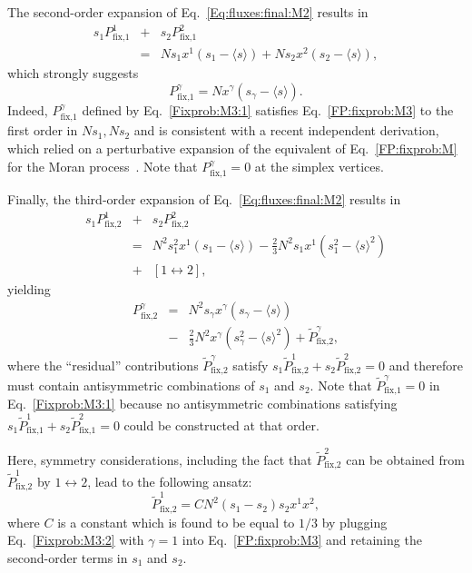 \documentclass[9pt,twocolumn,twoside]{gsajnl}
\begin{document}
The second-order expansion of Eq.~\eqref{Eq:fluxes:final:M2} results in
\begin{eqnarray} \label{Constr:M3:2}
s_1 P_{\text{fix,1}}^{1} &+& s_2 P_{\text{fix,1}}^{2} \\
&=& N s_1 x^1 (s_1 - \langle s \rangle) + N s_2 x^2 (s_2 - \langle s \rangle), \nonumber
\end{eqnarray}
which strongly suggests
\begin{equation} \label{Fixprob:M3:1}
P_{\text{fix,1}}^{\gamma} = N x^\gamma (s_\gamma - \langle s \rangle).
\end{equation}
Indeed, $P_{\text{fix,1}}^{\gamma}$ defined by Eq.~\eqref{Fixprob:M3:1} satisfies Eq.~\eqref{FP:fixprob:M3} to the first order in $Ns_1,Ns_2$ and is consistent with
a recent independent derivation, which relied on a perturbative expansion of the equivalent of Eq.~\eqref{FP:fixprob:M} for the Moran process~\citep{Braga2026}.
Note that $P_{\text{fix,1}}^{\gamma} = 0$ at the simplex vertices. 

Finally, the third-order expansion of Eq.~\eqref{Eq:fluxes:final:M2} results in
\begin{eqnarray} \label{Constr:M3:3}
s_1 P_{\text{fix,2}}^{1} &+& s_2 P_{\text{fix,2}}^{2} \\
&=& N ^2 s_1^2 x^1 (s_1 - \langle s \rangle) - \frac{2}{3} N^2 s_1 x^1 (s_1^2 - \langle s \rangle^2) \nonumber \\
&+& [ 1 \leftrightarrow 2], \nonumber
\end{eqnarray}
yielding
\begin{eqnarray} \label{Fixprob:M3:2}
P_{\text{fix,2}}^{\gamma} &=& N ^2 s_\gamma x^\gamma (s_\gamma - \langle s \rangle) \\
&-& \frac{2}{3} N^2 x^\gamma (s_\gamma^2 - \langle s \rangle^2) + \tilde{P}_{\text{fix,2}}^{\gamma}, \nonumber
\end{eqnarray}
where the ``residual'' contributions $\tilde{P}_{\text{fix,2}}^{\gamma}$ satisfy $s_1 \tilde{P}_{\text{fix,2}}^{1} + s_2 \tilde{P}_{\text{fix,2}}^{2} = 0$
and therefore must contain antisymmetric combinations of $s_1$ and $s_2$. Note that $\tilde{P}_{\text{fix,1}}^{\gamma} = 0$ in Eq.~\eqref{Fixprob:M3:1} because
no antisymmetric combinations satisfying $s_1 \tilde{P}_{\text{fix,1}}^{1} + s_2 \tilde{P}_{\text{fix,1}}^{2} = 0$ could be constructed at that order.

Here, symmetry considerations, including the fact that $\tilde{P}_{\text{fix,2}}^{2}$ can be obtained from $\tilde{P}_{\text{fix,2}}^{1}$ by $1 \leftrightarrow 2$, lead to the following ansatz:
\begin{equation} \label{Fixprob:M3:2res}
\tilde{P}_{\text{fix,2}}^{1} = C N^2 (s_1 - s_2) s_2 x^1 x^2,
\end{equation}
where $C$ is a constant which is found to be equal to $1/3$ by plugging Eq.~\eqref{Fixprob:M3:2} with $\gamma = 1$ into Eq.~\eqref{FP:fixprob:M3}
and retaining the second-order terms in $s_1$ and $s_2$. 
\end{document}
